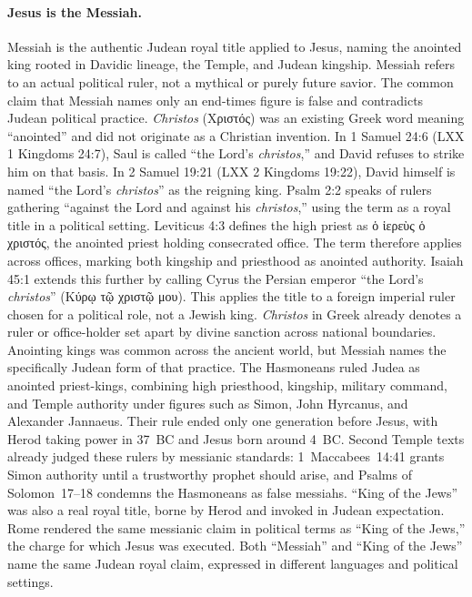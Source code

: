 \paragraph{Jesus is the Messiah.}\label{par:jesus-is-the-messiah.}
Messiah is the authentic Judean royal title applied to Jesus, naming the anointed king rooted in Davidic lineage, the Temple, and Judean kingship.
Messiah refers to an actual political ruler, not a mythical or purely future savior.
The common claim that Messiah names only an end-times figure is false and contradicts Judean political practice.
\emph{Christos} (Χριστός) was an existing Greek word meaning ``anointed'' and did not originate as a Christian invention.
In 1 Samuel 24:6 (LXX 1 Kingdoms 24:7), Saul is called ``the Lord's \emph{christos},'' and David refuses to strike him on that basis.
In 2 Samuel 19:21 (LXX 2 Kingdoms 19:22), David himself is named ``the Lord's \emph{christos}'' as the reigning king.
Psalm 2:2 speaks of rulers gathering ``against the Lord and against his \emph{christos},'' using the term as a royal title in a political setting.
Leviticus 4:3 defines the high priest as ὁ ἱερεὺς ὁ χριστός, the anointed priest holding consecrated office.
The term therefore applies across offices, marking both kingship and priesthood as anointed authority.
Isaiah 45:1 extends this further by calling Cyrus the Persian emperor ``the Lord's \emph{christos}'' (Κύρῳ τῷ χριστῷ μου).
This applies the title to a foreign imperial ruler chosen for a political role, not a Jewish king.
\emph{Christos} in Greek already denotes a ruler or office-holder set apart by divine sanction across national boundaries.
Anointing kings was common across the ancient world, but Messiah names the specifically Judean form of that practice.
The Hasmoneans ruled Judea as anointed priest-kings, combining high priesthood, kingship, military command, and Temple authority under figures such as Simon, John Hyrcanus, and Alexander Jannaeus.
Their rule ended only one generation before Jesus, with Herod taking power in 37~BC and Jesus born around 4~BC.
Second Temple texts already judged these rulers by messianic standards: 1~Maccabees~14:41 grants Simon authority until a trustworthy prophet should arise, and Psalms of Solomon~17--18 condemns the Hasmoneans as false messiahs.
``King of the Jews'' was also a real royal title, borne by Herod and invoked in Judean expectation.
Rome rendered the same messianic claim in political terms as ``King of the Jews,'' the charge for which Jesus was executed.
Both ``Messiah'' and ``King of the Jews'' name the same Judean royal claim, expressed in different languages and political settings.
